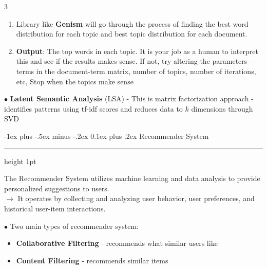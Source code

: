 \documentclass[letterpaper, 10.5pt,landscape]{article}
\makeatletter
\renewcommand{\section}{\@startsection{section}{1}{0mm}%
                                {-1ex plus -.5ex minus -.2ex}%
                                {0.1ex plus .2ex}%
                                {\normalfont\small}}
\makeatother
\begin{document}
\begin{multicols*}{3}
\begin{enumerate}
    \item Library like \textbf{Genism} will go through the process of finding the best word distribution for each topic and best topic distribution for each document.
\vspace{-2pt}

    \item  \textbf{Output}: The top words in each topic. It is your job as a human to interpret this and see if the results makes sense. If not, try altering the parameters - terms in the document-term matrix, number of topics, number of iterations, etc, Stop when the topics make sense
\vspace{-2pt}
\end{enumerate}



$\bullet$ \textbf{Latent Semantic Analysis} (LSA) - This is matrix factorization approach - identifies patterns using tf-idf scores and reduces data to $k$ dimensions through SVD











\vspace*{\fill}
\columnbreak

\section{Recommender System} {\color{teal}\hrule height 1pt} \smallskip

The Recommender System utilizes machine learning and data analysis to provide personalized suggestions to users. \\
$\rightarrow$ It operates by collecting and analyzing user behavior, user preferences, and historical user-item interactions.

\vspace{3pt}

$\bullet$ Two main types of recommender system:
\vspace{-3pt}
\begin{itemize}[label={--},leftmargin=4mm]
\item \textbf{Collaborative Filtering} - recommends what similar users like
\vspace{-3pt}
\item \textbf{Content Filtering} - recommends similar items
\end{itemize}


\end{multicols*}
\end{document}
